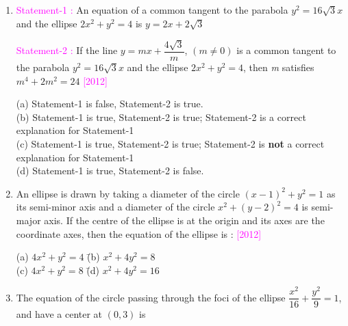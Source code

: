 \documentclass[journal,12pt,twocolumn]{IEEEtran}
\theoremstyle{remark}
\begin{document}
\begin{enumerate}[label=\textcolor{magenta}{\arabic*.}]
    \hfill{\textcolor{magenta}{[2011]}}
    
    \begin{tabbing}
        (a) $5x^2+3y^2-48=0$ \hspace{0em} \= (b) $3x^2+5y^2-15=0$ \\
        (c) $5x^2+3y^2-32=0$ \hspace{0em} \= (d) $3x^2+5y^2-32=0$ \\
    \end{tabbing}
    \item
    \textcolor{magenta}{Statement-1 :} An equation of a common tangent to the parabola $y^2=16\sqrt{3}x$ and the ellipse $2x^2+y^2=4$ is $y=2x+2\sqrt{3}$
    
    \textcolor{magenta}{Statement-2 :} If the line $y=mx+\dfrac{4\sqrt{3}}{m}$, $(m\neq0)$ is a common tangent to the parabola $y^2=16\sqrt{3}x$ and the ellipse $2x^2+y^2=4$, then \textit{m} satisfies $m^4+2m^2=24$ 
    \hfill{\textcolor{magenta}{[2012]}}
    
    (a) Statement-1 is false, Statement-2 is true.\\
    (b) Statement-1 is true, Statement-2 is true; Statement-2
    is a correct explanation for Statement-1\\
    (c) Statement-1 is true, Statement-2 is true; Statement-2
    is \textbf{not} a correct explanation for Statement-1\\
    (d) Statement-1 is true, Statement-2 is false.\\
    \item An ellipse is drawn by taking a diameter of the circle $(x-1)^2+y^2=1$ as its semi-minor axis and a diameter of the circle $x^2+(y-2)^2=4$ is semi-major axis. If the centre of the ellipse is at the origin and its axes are the coordinate axes, then the equation of the ellipse is : 
    \hfill{\textcolor{magenta}{[2012]}}
    
    \begin{tabbing}
        (a) $4x^2+y^2=4$ \hspace{3em} \= (b) $x^2+4y^2=8$ \\
        (c) $4x^2+y^2=8$ \hspace{3em} \= (d) $x^2+4y^2=16$ \\
    \end{tabbing}
    \item The equation of the circle passing through the foci of the ellipse $\dfrac{x^2}{16}+\dfrac{y^2}{9}=1$, and have a center at $(0,3)$ is
    

\end{enumerate}
\end{document}
